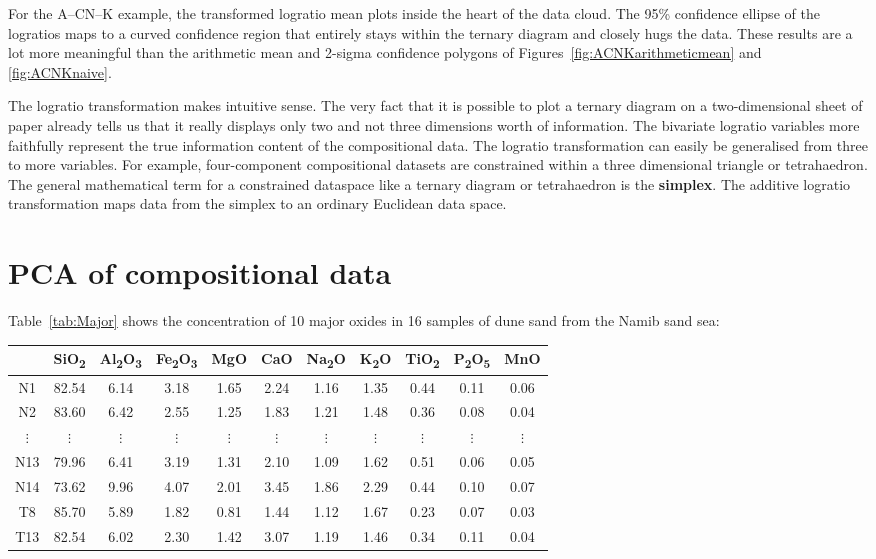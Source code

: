 For the A--CN--K example, the transformed logratio mean plots inside
the heart of the data cloud. The 95\% confidence ellipse of the
logratios maps to a curved confidence region that entirely stays
within the ternary diagram and closely hugs the data. These results
are a lot more meaningful than the arithmetic mean and 2-sigma
confidence polygons of Figures~\ref{fig:ACNKarithmeticmean} and
\ref{fig:ACNKnaive}.\medskip

The logratio transformation makes intuitive sense. The very fact that
it is possible to plot a ternary diagram on a two-dimensional sheet of
paper already tells us that it really displays only two and not three
dimensions worth of information. The bivariate logratio variables more
faithfully represent the true information content of the compositional
data. The logratio transformation can easily be generalised from three
to more variables. For example, four-component compositional datasets
are constrained within a three dimensional triangle or tetrahaedron.
The general mathematical term for a constrained dataspace like a
ternary diagram or tetrahaedron is the \textbf{simplex}.  The additive
logratio transformation maps data from the simplex to an ordinary
Euclidean data space.

\section{PCA of compositional data}
\label{sec:compositionalPCA}

Table~\ref{tab:Major} shows the concentration of 10 major oxides in 16
samples of dune sand from the Namib sand sea:

\begin{center}
\begin{tabular}{c|cccccccccc}
 & SiO\textsubscript{2} & Al\textsubscript{2}O\textsubscript{3} & 
Fe\textsubscript{2}O\textsubscript{3} & MgO & CaO & Na\textsubscript{2}O & 
K\textsubscript{2}O & TiO\textsubscript{2} & 
P\textsubscript{2}O\textsubscript{5} & MnO\\ \hline
N1 & 82.54 & 6.14 & 3.18 & 1.65 & 2.24 & 1.16 & 1.35 & 0.44 & 0.11 & 0.06\\
N2 & 83.60 & 6.42 & 2.55 & 1.25 & 1.83 & 1.21 & 1.48 & 0.36 & 0.08 & 0.04\\
$\vdots$ & $\vdots$ & $\vdots$ & $\vdots$ & $\vdots$ & $\vdots$ &
$\vdots$ & $\vdots$ & $\vdots$ & $\vdots$ & $\vdots$ \\
N13 & 79.96 & 6.41 & 3.19 & 1.31 & 2.10 & 1.09 & 1.62 & 0.51 & 0.06 & 0.05\\
N14 & 73.62 & 9.96 & 4.07 & 2.01 & 3.45 & 1.86 & 2.29 & 0.44 & 0.10 & 0.07\\
T8 & 85.70 & 5.89 & 1.82 & 0.81 & 1.44 & 1.12 & 1.67 & 0.23 & 0.07 & 0.03\\
T13 & 82.54 & 6.02 & 2.30 & 1.42 & 3.07 & 1.19 & 1.46 & 0.34 & 0.11 & 0.04
\end{tabular}
\label{tab:Major}
\end{center}

